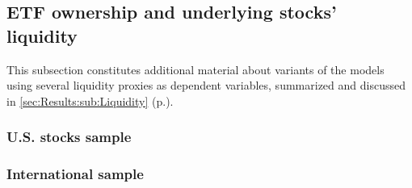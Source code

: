 {\begin{landscape}
    \subsection{ETF ownership and underlying stocks' liquidity}
    \label{app:sec:DetailedResults:Liquidity}
    This subsection constitutes additional material about variants of the models using several liquidity proxies as dependent variables, summarized and discussed in \autoref{sec:Results:sub:Liquidity} (p.\pageref{sec:Results:sub:Liquidity}).
    \subsubsection{U.S. stocks sample}
    \begin{table}[H]
      
    \end{table}
    \begin{table}[H]
      
    \end{table}
    \begin{table}[H]
      
    \end{table}
    \begin{table}[H]
      
    \end{table}

    \subsubsection{International sample}
    \begin{table}[H]
      
    \end{table}
    \begin{table}[H]
      
    \end{table}
    \begin{table}[H]
      
    \end{table}
    \begin{table}[H]
      
    \end{table}


\end{landscape}}
